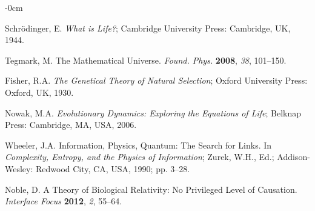 \documentclass[entropy,article,submit,pdftex,moreauthors]{Definitions/mdpi}
\begin{document}


\acknowledgments{}


\begin{adjustwidth}{-\extralength}{0cm}



%

\begin{thebibliography}{999}

Schrödinger, E. \textit{What is Life?}; Cambridge University Press: Cambridge, UK, 1944.

Tegmark, M. The Mathematical Universe. \textit{Found. Phys.} \textbf{2008}, \textit{38}, 101–150. 

Fisher, R.A. \textit{The Genetical Theory of Natural Selection}; Oxford University Press: Oxford, UK, 1930.

Nowak, M.A. \textit{Evolutionary Dynamics: Exploring the Equations of Life}; Belknap Press: Cambridge, MA, USA, 2006.

Wheeler, J.A. Information, Physics, Quantum: The Search for Links. In \textit{Complexity, Entropy, and the Physics of Information}; Zurek, W.H., Ed.; Addison-Wesley: Redwood City, CA, USA, 1990; pp. 3–28.

Noble, D. A Theory of Biological Relativity: No Privileged Level of Causation. \textit{Interface Focus} \textbf{2012}, \textit{2}, 55–64.


\end{thebibliography}
\end{adjustwidth}
\end{document}
